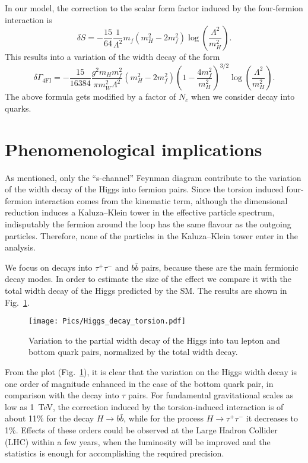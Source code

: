 \documentclass{ws-mpla}
\renewcommand{\(}{\left(}
\renewcommand{\)}{\right)}
\renewcommand{\[}{\left[}
\renewcommand{\]}{\right]}
\begin{document}
In our model, the correction to the scalar form factor induced by the four-fermion interaction is
\begin{equation}
  \delta S = - \frac{15}{64} \frac{1}{\Lambda^2} m_f \( m_H^2 - 2 m_f^2 \) \log\( \frac{\Lambda^2}{m_H^2} \).
\end{equation}
This results into a variation of the width decay  of the form
\begin{equation}
  \delta \Gamma_{\text{4FI}} = -\frac{15}{16384} \frac{g^2 m_H m_f^2}{\pi m_W^2 \Lambda^2} \( m_H^2 - 2 m_f^2 \) \( 1 - \frac{4m_f^2}{m_H^2} \)^{3/2} \log\( \frac{\Lambda^2}{m_H^2} \) .
\end{equation}
The above formula gets modified by a factor of $N_c$ when we consider decay into quarks.


\section{Phenomenological implications}\label{phenom}

As mentioned, only the ``s-channel'' Feynman diagram contribute to the variation of the width decay of the Higgs into fermion pairs. Since the torsion induced four-fermion interaction comes from the kinematic term, although the dimensional reduction induces a Kaluza--Klein tower in the effective particle spectrum, indisputably the fermion around the loop has the same flavour as the outgoing particles. Therefore, none of the particles in the Kaluza--Klein tower enter in the analysis.

We focus on decays into $\tau^+ \tau^-$ and $b \bar{b}$ pairs, because these are the main fermionic decay modes. In order to estimate the size of the effect we compare it with the total width decay of the Higgs predicted by the SM. The results are shown in Fig.~\ref{fig:Hdt}.
\begin{figure}[ph]
  \begin{center}
    \texttt{[image: Pics/Higgs\_decay\_torsion.pdf]} 
  \end{center}
  \caption{Variation to the partial width decay of the Higgs into tau lepton and bottom quark pairs, normalized by the total width decay.}
  \label{fig:Hdt}
\end{figure}

From the plot (Fig.~\ref{fig:Hdt}), it is clear that the variation on the Higgs width decay is one order of magnitude enhanced in the case of the bottom quark pair, in comparison with the decay into $\tau$ pairs. For fundamental gravitational scales as low as \SI{1}{\TeV}, the correction induced by the torsion-induced interaction is of about \num{11}\% for the decay $H \to b\bar{b}$, while for the process $H \to \tau^+ \tau^-$ it decreases to \num{1}\%. Effects of these orders could be observed at the Large Hadron Collider (LHC) within a few years, when the luminosity will be improved and the statistics is enough for accomplishing the required precision.
\end{document}
